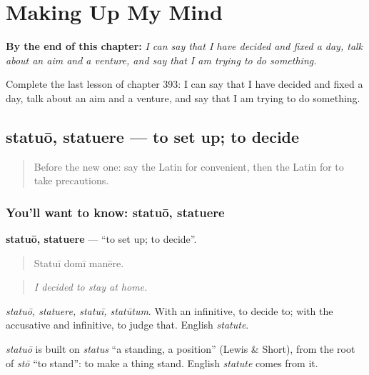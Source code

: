 
\chapter{Making Up My Mind}
\label{ch:la-making-up-my-mind}

\begin{chapteropening}
\textbf{By the end of this chapter:} \emph{I can say that I have decided and fixed a day, talk about an aim and a venture, and say that I am trying to do something.}

Complete the last lesson of chapter 393: I can say that I have decided and fixed a day, talk about an aim and a venture, and say that I am trying to do something.
\end{chapteropening}

\section[statuō, statuere]{statuō, statuere — to set up; to decide}

\label{lesson:LA-C393-statuo}



\begin{quote}
Before the new one: say the Latin for convenient, then the Latin for to take precautions.
\end{quote}

\subsection*{You'll want to know: statuō, statuere}
\textbf{statuō, statuere} — \textquotedblleft{}to set up; to decide\textquotedblright{}.

\begin{quote}
Statuī domī manēre.
\end{quote}

\begin{quote}
\emph{I decided to stay at home.}
\end{quote}

\emph{statuō, statuere, statuī, statūtum}. With an infinitive, to decide to; with the accusative and infinitive, to judge that. English \emph{statute}.

\begin{cousinweb}
\emph{statuō} is built on \emph{status} \textquotedblleft{}a standing, a position\textquotedblright{} (Lewis \& Short), from the root of \emph{stō} \textquotedblleft{}to stand\textquotedblright{}: to make a thing stand. English \emph{statute} comes from it.
\end{cousinweb}

